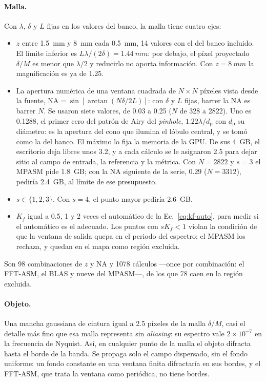 \paragraph{Malla.} Con $\lambda$, $\delta$ y $L$ fijas en los valores del
banco, la malla tiene cuatro ejes:
\begin{itemize}
  \item $z$ entre \SI{1.5}{mm} y \SI{8}{mm} cada \SI{0.5}{mm}, 14 valores con
  el del banco incluido. El límite inferior es $L\lambda/(2\delta) =
  \SI{1.44}{mm}$: por debajo, el píxel proyectado $\delta/M$ es menor que
  $\lambda/2$ y reducirlo no aporta información. Con $z = \SI{8}{mm}$ la
  magnificación es ya de 1.25.
  \item La apertura numérica de una ventana cuadrada de $N\times N$ píxeles
  vista desde la fuente, $\mathrm{NA} = \sin[\arctan(N\delta/2L)]$: con
  $\delta$ y $L$ fijas, barrer la NA es barrer $N$. Se usaron siete valores,
  de 0.03 a 0.25 ($N$ de 328 a 2822). Uno es 0.1288, el primer cero del patrón
  de Airy del \emph{pinhole}, $1.22\lambda/d_\mathrm{p}$ con $d_\mathrm{p}$ su
  diámetro: es la apertura del cono que ilumina el lóbulo central, y se tomó
  como la del banco. El máximo lo fija la memoria de la GPU. De sus
  \SI{4}{GB}, el escritorio deja libres unos 3.2, y a cada cálculo se le
  asignaron 2.5 para dejar sitio al campo de entrada, la referencia y la
  métrica. Con $N = 2822$ y $s = 3$ el MPASM pide \SI{1.8}{GB}; con la NA
  siguiente de la serie, 0.29 ($N = 3312$), pediría \SI{2.4}{GB}, al límite de
  ese presupuesto.
  \item $s \in \{1, 2, 3\}$. Con $s = 4$, el punto mayor pediría
  \SI{2.6}{GB}.
  \item $K_f$ igual a 0.5, 1 y 2 veces el automático de la
  Ec.~\eqref{eq:kf-auto}, para
  medir si el automático es el adecuado. Los puntos con $sK_f < 1$ violan la
  condición de que la ventana de salida quepa en el periodo del espectro; el
  MPASM los rechaza, y quedan en el mapa como región excluida.
\end{itemize}
Son 98 combinaciones de $z$ y NA y 1078 cálculos ---once por combinación: el
FFT-ASM, el BLAS y nueve del MPASM---, de los que 78 caen en la región
excluida.

\paragraph{Objeto.} Una mancha gaussiana de cintura igual a 2.5 píxeles de la
malla $\delta/M$, casi el detalle más fino que esa malla representa sin
\emph{aliasing}: su espectro vale $2\times10^{-7}$ en la frecuencia de Nyquist.
Así, en cualquier punto de la malla el objeto difracta hasta el borde de la
banda. Se propaga solo el campo dispersado, sin el fondo uniforme: un fondo
constante en una ventana finita difractaría en sus bordes, y el FFT-ASM, que
trata la ventana como periódica, no tiene bordes.

